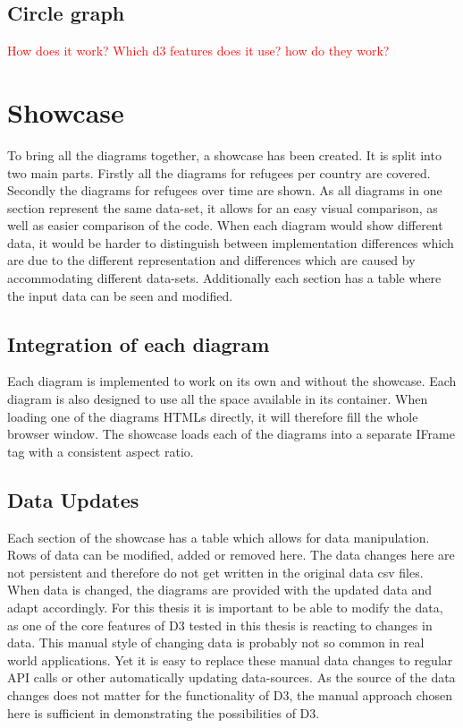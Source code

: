 \subsection{Circle graph}
\textcolor{red}{
How does it work? Which d3 features does it use? how do they work?}


\section{Showcase}

To bring all the diagrams together, a showcase has been created. It  is split into two main parts. Firstly all the diagrams for refugees per country are covered. Secondly the diagrams for refugees over time are shown. As all diagrams in one section represent the same data-set, it allows for an easy visual comparison, as well as easier comparison of the code. When each diagram would show different data, it would be harder to distinguish between implementation differences which are due to the different representation and differences which are caused by accommodating different data-sets. Additionally each section has a table where the input data can be seen and modified.

\subsection{Integration of each diagram}

Each diagram is implemented to work on its own and without the showcase. Each diagram is also designed to use all the space available in its container. When loading one of the diagrams HTMLs directly, it will therefore fill the whole browser window. The showcase loads each of the diagrams into a separate IFrame tag with a consistent aspect ratio.

\subsection{Data Updates}

Each section of the showcase has a table which allows for data manipulation. Rows of data can be modified, added or removed here. The data changes here are not persistent and therefore do not get written in the original data csv files. When data is changed, the diagrams are provided with the updated data and adapt accordingly. For this thesis it is important to be able to modify the data, as one of the core features of D3 tested in this thesis is reacting to changes in data. This manual style of changing data is probably not so common in real world applications. Yet it is easy to replace these manual data changes to regular API calls or other automatically updating data-sources. As the source of the data changes does not matter for the functionality of D3, the manual approach chosen here is sufficient in demonstrating the possibilities of D3.
